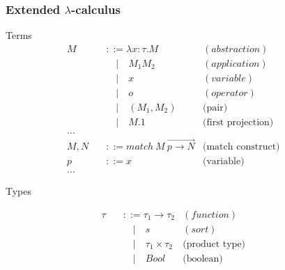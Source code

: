 \documentclass[t,24pt,aspectratio=169]{beamer}
\begin{document}
\begin{frame}[hvid]
    \frametitle{Extended $\lambda$-calculus}
    \begin{multicols}{2}
        \begin{center}
            Terms
            \[
                \begin{aligned}
                    M \quad   & ::= \lambda x : \tau.M                           & (abstraction)             &  & \\
                              & \quad | \quad M_1 M_2                            & (application)             &  & \\
                              & \quad | \quad x                                  & (variable)                &  & \\
                              & \quad | \quad o                                  & (operator)                &  & \\
                              & \quad | \quad (M_1,M_2)                          & \text{(pair)}             &  & \\
                              & \quad | \quad M.1                                & \text{(first projection)} &  & \\
                    ...                                                                                           \\
                    M,N \quad & ::= match \ M \ \overrightarrow{p \rightarrow N} & \text{(match construct)}  &  & \\
                    p \quad   & ::= x                                            & \text{(variable)}         &  & \\
                    ...       &                                                  &                           &  &
                \end{aligned}
            \]
        \end{center}
        \columnbreak
        \begin{center}
            Types
        \end{center}
        \[
            \begin{aligned}
                \tau \quad & ::= \tau_1 \rightarrow \tau_2      & (function)            &  & \\
                           & \quad | \quad s                    & (sort)                &  & \\
                           & \quad | \quad \tau_1 \times \tau_2 & \text{(product type)} &  & \\
                           & \quad | \quad Bool                 & \text{(boolean)}
            \end{aligned}
        \]

    \end{multicols}
\end{frame}
\end{document}
